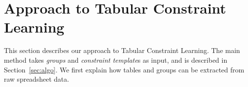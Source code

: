 \documentclass{sig-alternate-05-2015}
\newcommand{\constraints}{\ensuremath{\mathcal{T}}\xspace}
\newcommand{\format}[1]{\textit{#1}\xspace}
\newcommand{\template}{\format{constraint template}}
\newcommand{\dependencies}{\ensuremath{\mathcal{D}}\xspace}
\newcommand{\groups}{\ensuremath{\mathcal{G}}\xspace}
\begin{document}
%



\newcommand{\tcl}{Tabular Constraint Learning}
\section{Approach to Tabular Constraint Learning}\label{sec:approach}
This section describes our approach to \tcl. The main method takes \textit{groups} and {\template}s as input, and is described in Section~\ref{sec:algo}. We first explain how tables and groups can be extracted from raw spreadsheet data.
\end{document}
